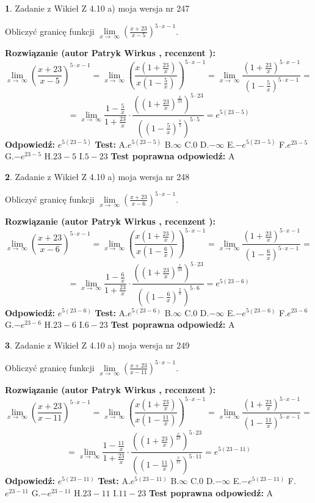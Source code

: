 \documentclass[12pt, a4paper]{article}
\theoremstyle{definition} %
\newtheorem{zad}{}
\newcommand{\zadStart}[1]{\begin{zad}#1\newline}
\newcommand{\zadStop}{\end{zad}}
\newcommand{\rozwStart}[2]{\noindent \textbf{Rozwiązanie (autor #1 , recenzent #2): }\newline}
\newcommand{\rozwStop}{\newline}
\newcommand{\odpStart}{\noindent \textbf{Odpowiedź:}\newline}
\newcommand{\odpStop}{\newline}
\newcommand{\testStart}{\noindent \textbf{Test:}\newline}
\newcommand{\testStop}{\newline}
\newcommand{\kluczStart}{\noindent \textbf{Test poprawna odpowiedź:}\newline}
\newcommand{\kluczStop}{\newline}
\begin{document}
\zadStart{Zadanie z Wikieł Z 4.10 a) moja wersja nr 247}


Obliczyć granicę funkcji  $\lim\limits_{x\to\ \infty}(\frac{x+23}{x-5})^{5\cdot x-1}$.
\zadStop
\rozwStart{Patryk Wirkus}{}
$$\lim\limits_{x\to\ \infty}(\frac{x+23}{x-5})^{5\cdot x-1} = \lim\limits_{x\to\ \infty}(\frac{x(1+\frac{23}{x})}{x(1-\frac{5}{x})})^{5\cdot x-1}=\lim\limits_{x\to\ \infty}\frac{(1+\frac{23}{x})^{5\cdot x-1}}{(1-\frac{5}{x})^{5\cdot x-1}}=$$
$$=\lim\limits_{x\to\ \infty}\frac{1-\frac{5}{x}}{1+\frac{23}{x}}\cdot\frac{((1+\frac{23}{x})^{\frac{x}{23}})^{5\cdot23}}{((1-\frac{5}{x})^{\frac{x}{5}})^{5\cdot5}}=e^{5(23-5)}$$
\rozwStop
\odpStart
$e^{5(23-5)}$
\odpStop
\testStart
A.$e^{5(23-5)}$ B.$\infty$ C.$0$ D.$-\infty$ E.$-e^{5(23-5)}$
F.$e^{23-5}$ G.$-e^{23-5}$
H.$23-5$
I.$5-23$
\testStop
\kluczStart
A
\kluczStop



\zadStart{Zadanie z Wikieł Z 4.10 a) moja wersja nr 248}


Obliczyć granicę funkcji  $\lim\limits_{x\to\ \infty}(\frac{x+23}{x-6})^{5\cdot x-1}$.
\zadStop
\rozwStart{Patryk Wirkus}{}
$$\lim\limits_{x\to\ \infty}(\frac{x+23}{x-6})^{5\cdot x-1} = \lim\limits_{x\to\ \infty}(\frac{x(1+\frac{23}{x})}{x(1-\frac{6}{x})})^{5\cdot x-1}=\lim\limits_{x\to\ \infty}\frac{(1+\frac{23}{x})^{5\cdot x-1}}{(1-\frac{6}{x})^{5\cdot x-1}}=$$
$$=\lim\limits_{x\to\ \infty}\frac{1-\frac{6}{x}}{1+\frac{23}{x}}\cdot\frac{((1+\frac{23}{x})^{\frac{x}{23}})^{5\cdot23}}{((1-\frac{6}{x})^{\frac{x}{6}})^{5\cdot6}}=e^{5(23-6)}$$
\rozwStop
\odpStart
$e^{5(23-6)}$
\odpStop
\testStart
A.$e^{5(23-6)}$ B.$\infty$ C.$0$ D.$-\infty$ E.$-e^{5(23-6)}$
F.$e^{23-6}$ G.$-e^{23-6}$
H.$23-6$
I.$6-23$
\testStop
\kluczStart
A
\kluczStop



\zadStart{Zadanie z Wikieł Z 4.10 a) moja wersja nr 249}


Obliczyć granicę funkcji  $\lim\limits_{x\to\ \infty}(\frac{x+23}{x-11})^{5\cdot x-1}$.
\zadStop
\rozwStart{Patryk Wirkus}{}
$$\lim\limits_{x\to\ \infty}(\frac{x+23}{x-11})^{5\cdot x-1} = \lim\limits_{x\to\ \infty}(\frac{x(1+\frac{23}{x})}{x(1-\frac{11}{x})})^{5\cdot x-1}=\lim\limits_{x\to\ \infty}\frac{(1+\frac{23}{x})^{5\cdot x-1}}{(1-\frac{11}{x})^{5\cdot x-1}}=$$
$$=\lim\limits_{x\to\ \infty}\frac{1-\frac{11}{x}}{1+\frac{23}{x}}\cdot\frac{((1+\frac{23}{x})^{\frac{x}{23}})^{5\cdot23}}{((1-\frac{11}{x})^{\frac{x}{11}})^{5\cdot11}}=e^{5(23-11)}$$
\rozwStop
\odpStart
$e^{5(23-11)}$
\odpStop
\testStart
A.$e^{5(23-11)}$ B.$\infty$ C.$0$ D.$-\infty$ E.$-e^{5(23-11)}$
F.$e^{23-11}$ G.$-e^{23-11}$
H.$23-11$
I.$11-23$
\testStop
\kluczStart
A
\kluczStop
\end{document}

